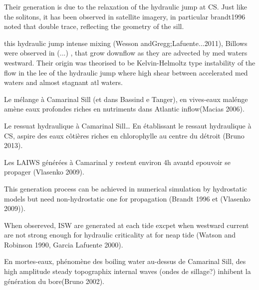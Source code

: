 Their generation is due to the relaxation of the hydraulic jump at CS. Just like the solitons, it has been observed in satellite imagery, in particular brandt1996 noted that double trace, reflecting the geometry of the sill.

this hydraulic jump  intense mixing (Wesson andGregg;Lafuente...2011),
Billows were observed in (...) , that grow downflow as they are advected by med waters westward. Their origin was theorised to be Kelvin-Helmoltz type instability of the flow in the lee of the hydraulic jump where high shear between accelerated med waters and almost stagnant atl waters.

Le mélange à Camarinal Sill (et dans Bassind e Tanger), en vives-eaux malénge amène eaux profondes riches en nutriments dans Atlantic inflow(Macias 2006).

Le ressuat hydraulique à Camarinal Sill… En établissant le ressaut hydraulique à CS, aspire des eaux côtières riches en chlorophylle au centre du détroit (Bruno 2013).

Les LAIWS générées à Camarinal y restent environ 4h avantd epouvoir se propager (Vlasenko 2009).

This generation process can be achieved in numerical simulation by hydrostatic models but need non-hydrostatic one for propagation (Brandt 1996 et (Vlasenko 2009)).

When obsereved, ISW are generated at each tide excpet when westward current are not strong enough for hydraulic criticality at for neap tide (Watson and Robinson 1990, Garcia Lafuente 2000). 

En mortes-eaux, phénomène des boiling water au-dessus de Camarinal Sill, des high amplitude steady topographix internal waves (ondes de sillage?) inhibent la génération du bore(Bruno 2002).


